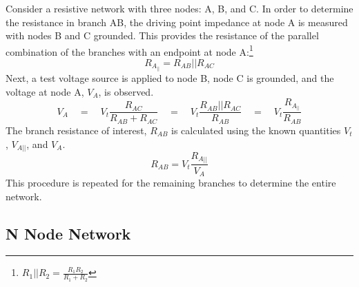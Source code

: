 Consider a resistive network with three nodes: A, B, and C. 
In order to determine the resistance in branch AB, the driving point impedance at node A is measured with nodes B and C grounded. 
This provides the resistance of the parallel combination of the branches with an endpoint at node A:\footnote
{$
	\displaystyle R_{1}||R_{2} = 
	\frac{R_{1}R_{2}}{R_{1}+R_{2}}
$}
\begin{equation*}
R_{A_{||}} = R_{AB}||R_{AC}
\end{equation*}
Next, a test voltage source is applied to node B, node C is grounded, and the voltage at node A, $V_A$, is observed.
\begin{equation*}
V_{A} \quad=\quad V_t
\frac{R_{AC}} {R_{AB}+R_{AC}} \quad = \quad V_t
\frac{R_{AB}||R_{AC}} {R_{AB}} \quad = \quad V_t
\frac{R_{A_{||}}} {R_{AB}}
\end{equation*}
The branch resistance of interest, $R_{AB}$ is calculated using the known quantities $V_t$, $V_{A{||}}$, and $V_A$.
\begin{equation*}
R_{AB} = 
V_t\frac{R_{A{||}}} {V_A}
\end{equation*}
This procedure is repeated for the remaining branches to determine the entire network.

\subsection{N Node Network}


